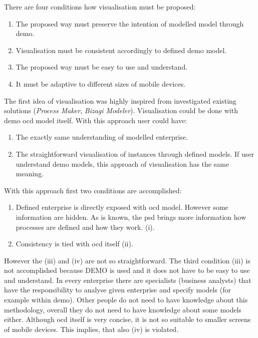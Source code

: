 There are four conditions how visualisation must be proposed:
\begin{enumerate}
	\item The proposed way must preserve the intention of modelled model through \gls{demo}.
    \item Visualisation must be consistent accordingly to defined \gls{demo} model.
    \item The proposed way must be easy to use and understand.  
    \item It must be adaptive to different sizes of mobile devices. 
\end{enumerate}

The first idea of visualisation was highly inspired from investigated existing solutions (\textit{Process Maker}, \textit{Bizagi Modeler}). Visualisation could be done with \gls{demo} \gls{ocd} model itself. With this approach user could have:
\begin{enumerate}
\item The exactly same understanding of modelled enterprise.
\item The straightforward visualisation of instances through defined models. If user understand \gls{demo} models, this approach of visualisation has the same meaning.
\end{enumerate}

With this approach first two conditions are accomplished:
\begin{enumerate}
\item Defined enterprise is directly exposed with \gls{ocd} model. However some information are hidden. As is known, the \gls{psd} brings more information how processes are defined and how they work. (i).
\item Consistency is tied with \gls{ocd} itself (ii).
\end{enumerate}

However the (iii) and (iv) are not so straightforward. The third condition (iii) is not accomplished because DEMO is used and it does not have to be easy to use and understand. In every enterprise there are specialists (business analysts) that have the responsibility to analyse given enterprise and specify models (for example within \gls{demo}). Other people do not need to have knowledge about this methodology, overall they do not need to have knowledge about some models either. Although \gls{ocd} itself is very concise, it is not so suitable to smaller screens of mobile devices. This implies, that also (iv) is violated.

